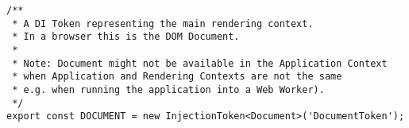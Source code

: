 \begin{verbatim}
/**
 * A DI Token representing the main rendering context.
 * In a browser this is the DOM Document.
 *
 * Note: Document might not be available in the Application Context
 * when Application and Rendering Contexts are not the same
 * e.g. when running the application into a Web Worker).
 */
export const DOCUMENT = new InjectionToken<Document>('DocumentToken');
\end{verbatim}
